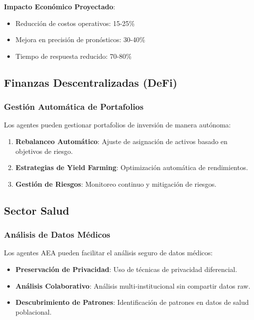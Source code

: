 \documentclass[12pt,a4paper]{article}
\begin{document}
\textbf{Impacto Económico Proyectado}:
\begin{itemize}
\item Reducción de costos operativos: 15-25\%
\item Mejora en precisión de pronósticos: 30-40\%
\item Tiempo de respuesta reducido: 70-80\%
\end{itemize}

\subsection{Finanzas Descentralizadas (DeFi)}

\subsubsection{Gestión Automática de Portafolios}

Los agentes pueden gestionar portafolios de inversión de manera autónoma:

\begin{enumerate}
\item \textbf{Rebalanceo Automático}: Ajuste de asignación de activos basado en objetivos de riesgo.
\item \textbf{Estrategias de Yield Farming}: Optimización automática de rendimientos.
\item \textbf{Gestión de Riesgos}: Monitoreo continuo y mitigación de riesgos.
\end{enumerate}

\subsection{Sector Salud}

\subsubsection{Análisis de Datos Médicos}

Los agentes AEA pueden facilitar el análisis seguro de datos médicos:

\begin{itemize}
\item \textbf{Preservación de Privacidad}: Uso de técnicas de privacidad diferencial.
\item \textbf{Análisis Colaborativo}: Análisis multi-institucional sin compartir datos raw.
\item \textbf{Descubrimiento de Patrones}: Identificación de patrones en datos de salud poblacional.
\end{itemize}
\end{document}
